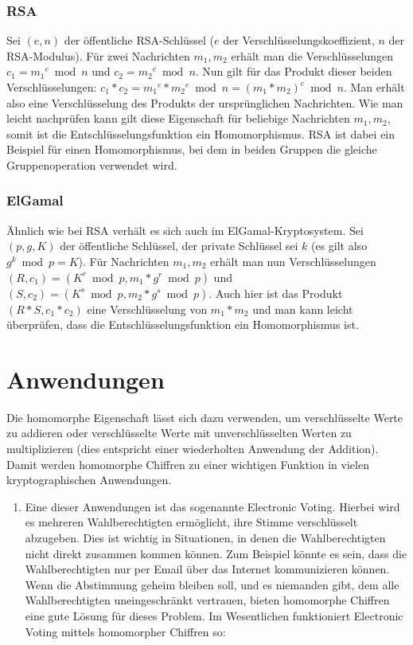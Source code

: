\begin{refsegment}
\subsubsection{RSA}

Sei $(e,n)$ der öffentliche RSA-Schlüssel ($e$ der Verschlüsselungskoeffizient, $n$ der RSA-Modulus). Für zwei Nachrichten $m_1, m_2$ erhält man die Verschlüsselungen $c_1 = {m_1}^e \bmod n$ und $c_2 = {m_2}^e \bmod n$. Nun gilt für das Produkt dieser beiden Verschlüsselungen: $c_1*c_2={m_1}^e * {m_2}^e \bmod n=(m_1*m_2)^e \bmod n$. Man erhält also eine Verschlüsselung des Produkts der ursprünglichen Nachrichten. Wie man leicht nachprüfen kann gilt diese Eigenschaft für beliebige Nachrichten $m_1, m_2$, somit ist die Entschlüsselungsfunktion ein Homomorphismus. RSA ist dabei ein Beispiel für einen Homomorphismus, bei dem in beiden Gruppen die gleiche Gruppenoperation verwendet wird.

\subsubsection{ElGamal}

Ähnlich wie bei RSA verhält es sich auch im ElGamal-Kryptosystem. Sei $(p,g,K)$ der öffentliche Schlüssel, der private Schlüssel sei $k$ (es gilt also $g^k \bmod p = K$). Für Nachrichten $m_1, m_2$ erhält man nun Verschlüsselungen $(R, c_1) = (K^r \bmod p, m_1*g^r \bmod p)$ und $(S,c_2) = (K^s \bmod p, m_2 * g^s \bmod p)$. Auch hier ist das Produkt $(R*S, c_1*c_2)$ eine Verschlüsselung von $m_1*m_2$ und man kann leicht überprüfen, dass die Entschlüsselungsfunktion ein Homomorphismus ist.

\section{Anwendungen}
Die homomorphe Eigenschaft lässt sich dazu verwenden, um verschlüsselte Werte zu addieren oder verschlüsselte Werte mit unverschlüsselten Werten zu multiplizieren (dies entspricht einer wiederholten Anwendung der Addition). Damit werden homomorphe Chiffren zu einer wichtigen Funktion in vielen kryptographischen Anwendungen.

\begin{enumerate}
\item Eine dieser Anwendungen ist das sogenannte \glqq Electronic Voting\grqq. Hierbei wird es mehreren Wahlberechtigten ermöglicht, ihre Stimme verschlüsselt abzugeben. Dies ist wichtig in Situationen, in denen die Wahlberechtigten nicht direkt zusammen kommen können. Zum Beispiel könnte es sein, dass die Wahlberechtigten nur per Email über das Internet kommunizieren können. Wenn die Abstimmung geheim bleiben soll, und es niemanden gibt, dem alle Wahlberechtigten uneingeschränkt vertrauen, bieten homomorphe Chiffren eine gute Lösung für dieses Problem. Im Wesentlichen funktioniert Electronic Voting mittels homomorpher Chiffren so:


\end{enumerate}
\end{refsegment}
